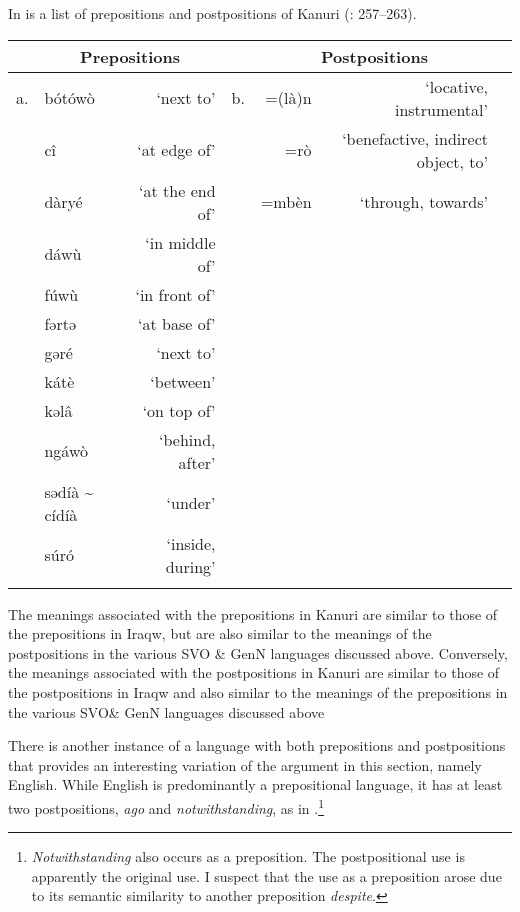 \documentclass[output=paper]{langsci/langscibook}
\begin{document}
In  is a list of prepositions and postpositions of Kanuri (\citealt{Hutchison1981}: 257–263).


\begin{table}
\begin{tabularx}{\textwidth}{Xlrrrrr} 
\lsptoprule
 & \multicolumn{2}{c}{\bfseries Prepositions} &  & \multicolumn{2}{c}{\bfseries Postpositions}\\
\midrule
a. & bótówò & ‘next to’ & b. & =(là)n & ‘locative, instrumental’\\
 & cî & ‘at edge of’ &  & =rò & ‘benefactive, indirect object, to’\\
 & dàryé & ‘at the end of’ &  & =mbèn & ‘through, towards’\\
 & dáwù & ‘in middle of’ &  &  & \\
 & fúwù & ‘in front of’ &  &  & \\
 & fərtə & ‘at base of’ &  &  & \\
 & gəré & ‘next to’ &  &  & \\
 & kátè & ‘between’ &  &  & \\
 & kəlâ & ‘on top of’ &  &  & \\
 & ngáwò & ‘behind, after’ &  &  & \\
 & sədíà {\textasciitilde} cídíà & ‘under’ &  &  & \\
 & súró & ‘inside, during’ &  &  & \\
\lspbottomrule
\end{tabularx}
\end{table}

The meanings associated with the prepositions in Kanuri are similar to those of the prepositions in Iraqw, but are also similar to the meanings of the postpositions in the various SVO \& GenN languages discussed above. Conversely, the meanings associated with the postpositions in Kanuri are similar to those of the postpositions in Iraqw and also similar to the meanings of the prepositions in the various SVO\& GenN languages discussed above

There is another instance of a language with both prepositions and postpositions that provides an interesting variation of the argument in this section, namely English. While English is predominantly a prepositional language, it has at least two postpositions, \textit{ago} and \textit{notwithstanding}, as in .\footnote{\textit{Notwithstanding} also occurs as a preposition. The postpositional use is apparently the original use. I suspect that the use as a preposition arose due to its semantic similarity to another preposition \textit{despite}.}
\end{document}
